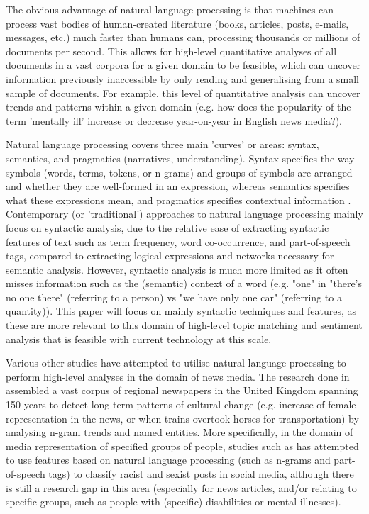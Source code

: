 \documentclass{report}
\begin{document}
The obvious advantage of natural language processing is that machines can process vast bodies of human-created literature (books, articles, posts, e-mails, messages, etc.) much faster than humans can, processing thousands or millions of documents per second. 
This allows for high-level quantitative analyses of all documents in a vast corpora for a given domain to be feasible, which can uncover information previously inaccessible by only reading and generalising from a small sample of documents.
For example, this level of quantitative analysis can uncover trends and patterns within a given domain (e.g. how does the popularity of the term 'mentally ill' increase or decrease year-on-year in English news media?). 

Natural language processing covers three main 'curves' or areas:  syntax, semantics, and pragmatics (narratives, understanding). 
Syntax specifies the way symbols (words, terms, tokens, or n-grams) and groups of symbols are arranged and whether they are well-formed in an expression, whereas semantics specifies what these expressions mean, and pragmatics specifies contextual information \cite{Jumping NLP Curves}.
Contemporary (or 'traditional') approaches to natural language processing mainly focus on syntactic analysis, due to the relative ease of extracting syntactic features of text such as term frequency, word co-occurrence, and part-of-speech tags, compared to extracting logical expressions and networks necessary for semantic analysis.
However, syntactic analysis is much more limited as it often misses information such as the (semantic) context of a word (e.g. "one" in "there's no one there" (referring to a person) vs "we have only one car" (referring to a quantity)).
This paper will focus on mainly syntactic techniques and features, as these are more relevant to this domain of high-level topic matching and sentiment analysis that is feasible with current technology at this scale.

Various other studies have attempted to utilise natural language processing to perform high-level analyses in the domain of news media.
The research done in \cite{Content analysis of 150 years of British periodicals} assembled a vast corpus of regional newspapers in the United Kingdom spanning 150 years to detect long-term patterns of cultural change (e.g. increase of female representation in the news, or when trains overtook horses for transportation) by analysing n-gram trends and named entities. 
More specifically, in the domain of media representation of specified groups of people, studies such as \cite{Are You a Racist or Am I Seeing Things?} has attempted to use features based on natural language processing (such as n-grams and part-of-speech tags) to classify racist and sexist posts in social media, although there is still a research gap in this area (especially for news articles, and/or relating to specific groups, such as people with (specific) disabilities or mental illnesses).
\end{document}
